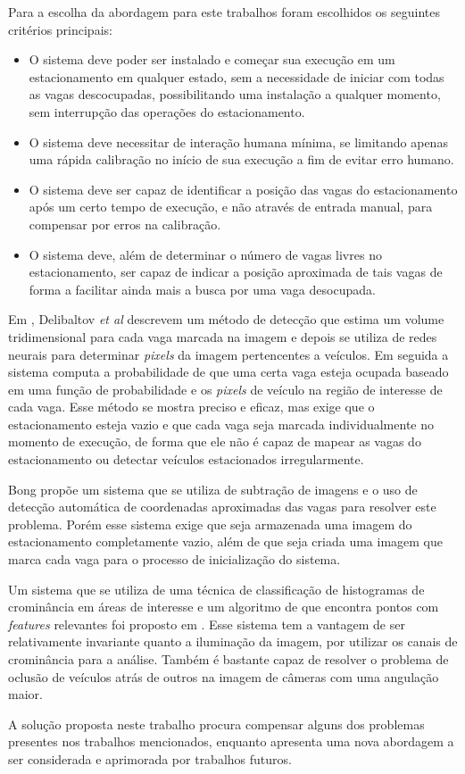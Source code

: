 Para a escolha da abordagem para este trabalhos foram escolhidos os seguintes critérios principais:

\begin{itemize}
	
	\item O sistema deve poder ser instalado e começar sua execução em um estacionamento em qualquer estado, sem a necessidade de iniciar com todas as vagas descocupadas, possibilitando uma instalação a qualquer momento, sem interrupção das operações do estacionamento.
	\item O sistema deve necessitar de interação humana mínima, se limitando apenas uma rápida calibração no início de sua execução a fim de evitar erro humano.
	\item O sistema deve ser capaz de identificar a posição das vagas do estacionamento após um certo tempo de execução, e não através de entrada manual, para compensar por erros na calibração.
	\item O sistema deve, além de determinar o número de vagas livres no estacionamento, ser capaz de indicar a posição aproximada de tais vagas de forma a facilitar ainda mais a busca por uma vaga desocupada.
	
\end{itemize}

Em \cite{delibaltov2013parking}, Delibaltov \textit{et al} descrevem um método de detecção que estima um volume tridimensional para cada vaga marcada na imagem e depois se utiliza de redes neurais para determinar \textit{pixels} da imagem pertencentes a veículos. Em seguida a sistema computa a probabilidade de que uma certa vaga esteja ocupada baseado em uma função de probabilidade e os \textit{pixels} de veículo na região de interesse de cada vaga. Esse método se mostra preciso e eficaz, mas exige que o estacionamento esteja vazio e que cada vaga seja marcada individualmente no momento de execução, de forma que ele não é capaz de mapear as vagas do estacionamento ou detectar veículos estacionados irregularmente.

Bong \cite{bong2008integrated} propõe um sistema que se utiliza de subtração de imagens e o uso de detecção automática de coordenadas aproximadas das vagas para resolver este problema. Porém esse sistema exige que seja armazenada uma imagem do estacionamento completamente vazio, além de que seja criada uma imagem que marca cada vaga para o processo de inicialização do sistema.

Um sistema que se utiliza de uma técnica de classificação de histogramas de crominância em áreas de interesse e um algoritmo de que encontra pontos com \textit{features} relevantes foi proposto em \cite{true2007vacant}. Esse sistema tem a vantagem de ser relativamente invariante quanto a iluminação da imagem, por utilizar os canais de crominância para a análise. Também é bastante capaz de resolver o problema de oclusão de veículos atrás de outros na imagem de câmeras com uma angulação maior.

A solução proposta neste trabalho procura compensar alguns dos problemas presentes nos trabalhos mencionados, enquanto apresenta uma nova abordagem a ser considerada e aprimorada por trabalhos futuros.








